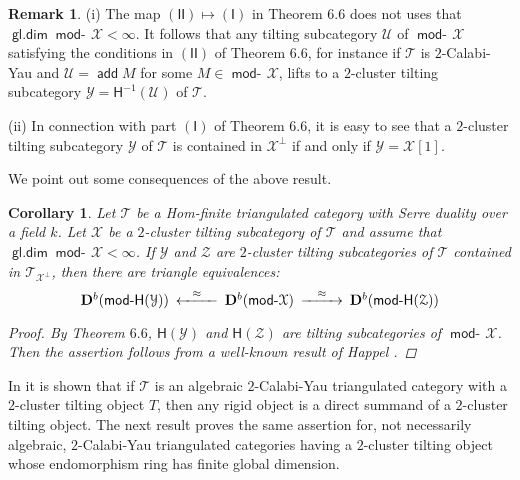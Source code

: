 \documentclass[oneside, a4paper,reqno]{amsart}
\numberwithin{equation}{section}
\newtheorem{cor}[thm]{Corollary}
\theoremstyle{definition}
\newtheorem{rem}[thm]{Remark}
\begin{document}
\begin{rem} (i) The map $\mathsf{(II)} \longmapsto \mathsf{(I)}$ in Theorem $6.6$ does not uses that $\operatorname*{\mathsf{gl.dim}}\operatorname*{\mathsf{mod}-\!}{\mathcal X} < \infty$. It follows that any tilting subcategory ${\mathcal U}$ of $\operatorname*{\mathsf{mod}-\!}{\mathcal X}$ satisfying the conditions in $\mathsf{(II)}$ of Theorem $6.6$, for instance if ${\mathcal T}$ is $2$-Calabi-Yau and ${\mathcal U} = \operatorname*{\mathsf{add}} M$ for some $M \in \operatorname*{\mathsf{mod}-\!}{\mathcal X}$,  lifts to a $2$-cluster tilting subcategory ${\mathcal Y} = \mathsf{H}^{-1}({\mathcal U})$ of ${\mathcal T}$. 

(ii) In connection with part $\mathsf{(I)}$ of Theorem $6.6$, it is easy to see that a $2$-cluster tilting subcategory ${\mathcal Y}$ of ${\mathcal T}$ is contained in ${\mathcal X}^{\bot}$ if and only if ${\mathcal Y} = {\mathcal X}[1]$.  
\end{rem}

We point out some consequences of the above result. 

\begin{cor} Let ${\mathcal T}$ be a Hom-finite triangulated category with Serre duality over a field $k$. Let ${\mathcal X}$ be a $2$-cluster tilting subcategory of ${\mathcal T}$ and assume that $\operatorname*{\mathsf{gl.dim}}\operatorname*{\mathsf{mod}-\!}{\mathcal X} < \infty$. If ${\mathcal Y}$ and ${\mathcal Z}$ are  $2$-cluster tilting subcategories of ${\mathcal T}$ contained in ${\mathcal T}_{{\mathcal X}^{\bot}}$, then there are triangle equivalences:
\[
\begin{CD}
{\bf D}^{b}(\operatorname*{\mathsf{mod}-\!}\mathsf{H}({\mathcal Y}))   @< \approx <<  {\bf D}^{b}(\operatorname*{\mathsf{mod}-\!}{\mathcal X})    @> \approx >> {\bf D}^{b}(\operatorname*{\mathsf{mod}-\!}\mathsf{H}({\mathcal Z}))
\end{CD}
\]
\begin{proof} By Theorem $6.6$, $\mathsf{H}({\mathcal Y})$ and $\mathsf{H}({\mathcal Z})$ are tilting subcategories of $\operatorname*{\mathsf{mod}-\!}{\mathcal X}$. Then the assertion follows from a well-known result of Happel \cite{Happel}.  
\end{proof}
\end{cor} 

In \cite[Theorem I.$1.8$]{BIRS} it is shown that if ${\mathcal T}$ is an algebraic $2$-Calabi-Yau triangulated category with a $2$-cluster tilting object $T$, then any rigid object is a direct summand of a $2$-cluster tilting object. The next result proves the same assertion for, not necessarily algebraic, $2$-Calabi-Yau triangulated categories having a $2$-cluster tilting object whose endomorphism ring has finite global dimension. 
\end{document}
